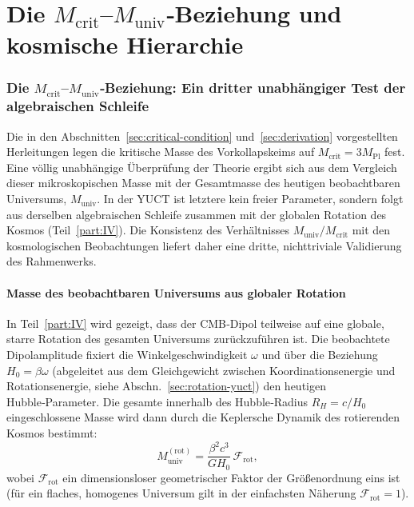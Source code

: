\documentclass[11pt,a4paper]{article}
\begin{document}
	\part{Die \(M_{\mathrm{crit}}\)–\(M_{\mathrm{univ}}\)‑Beziehung und kosmische Hierarchie}
	\label{part:II}
	
	\section{Die \(M_{\mathrm{crit}}\)–\(M_{\mathrm{univ}}\)‑Beziehung: Ein dritter unabhängiger Test der algebraischen Schleife}
	\label{sec:third-test}
	
	Die in den Abschnitten~\ref{sec:critical-condition} und~\ref{sec:derivation} vorgestellten Herleitungen legen die kritische Masse des Vorkollapskeims auf \(M_{\mathrm{crit}} = 3 M_{\mathrm{Pl}}\) fest. Eine völlig unabhängige Überprüfung der Theorie ergibt sich aus dem Vergleich dieser mikroskopischen Masse mit der Gesamtmasse des heutigen beobachtbaren Universums, \(M_{\mathrm{univ}}\). In der YUCT ist letztere kein freier Parameter, sondern folgt aus derselben algebraischen Schleife zusammen mit der globalen Rotation des Kosmos (Teil~\ref{part:IV}). Die Konsistenz des Verhältnisses \(M_{\mathrm{univ}} / M_{\mathrm{crit}}\) mit den kosmologischen Beobachtungen liefert daher eine dritte, nichttriviale Validierung des Rahmenwerks.
	
	\subsection{Masse des beobachtbaren Universums aus globaler Rotation}
	
	In Teil~\ref{part:IV} wird gezeigt, dass der CMB‑Dipol teilweise auf eine globale, starre Rotation des gesamten Universums zurückzuführen ist. Die beobachtete Dipolamplitude fixiert die Winkelgeschwindigkeit \(\omega\) und über die Beziehung \(H_0 = \beta \omega\) (abgeleitet aus dem Gleichgewicht zwischen Koordinationsenergie und Rotationsenergie, siehe Abschn.~\ref{sec:rotation-yuct}) den heutigen Hubble‑Parameter. Die gesamte innerhalb des Hubble‑Radius \(R_H = c / H_0\) eingeschlossene Masse wird dann durch die Keplersche Dynamik des rotierenden Kosmos bestimmt:
	\begin{equation}
		M_{\mathrm{univ}}^{\mathrm{(rot)}} = \frac{\beta^2 c^3}{G H_0} \, \mathcal{F}_{\mathrm{rot}},
		\label{eq:muniv-rot}
	\end{equation}
	wobei \(\mathcal{F}_{\mathrm{rot}}\) ein dimensionsloser geometrischer Faktor der Größenordnung eins ist (für ein flaches, homogenes Universum gilt in der einfachsten Näherung \(\mathcal{F}_{\mathrm{rot}} = 1\)).
	
\end{document}
